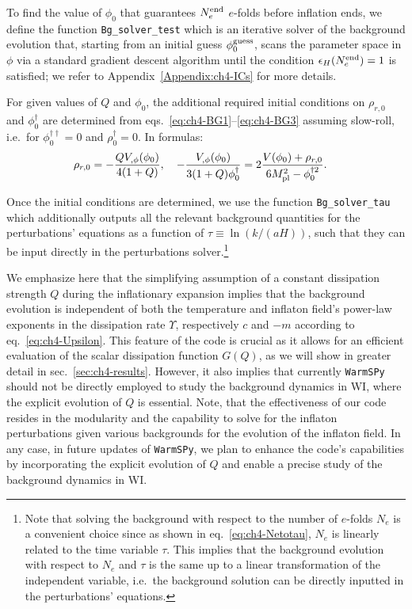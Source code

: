 To find the value of $\phi_0$ that guarantees $N_e^{\rm{end}}$ $e$-folds before inflation ends, we define the function \texttt{Bg\_solver\_test} which is an iterative solver of the background evolution that, starting from an initial guess $\phi_0^{\rm{guess}}$, scans the parameter space in $\phi$ via a standard gradient descent algorithm until the condition $\epsilon_H(N_e^{\rm{end}})=1$ is satisfied; we refer to Appendix~\ref{Appendix:ch4-ICs} for more details.
 
For given values of $Q$ and $\phi_0$, the additional required initial conditions on $\rho_{r,0}$ and $\phi^\dagger_0$ are determined from eqs.~\eqref{eq:ch4-BG1}--\eqref{eq:ch4-BG3} assuming slow-roll, i.e.\ for $\phi^{\dagger\dagger}_0=0$ and $\rho^{\dagger}_0=0$. In formulas:
\begin{align}
    & \rho_{r,0}=-\frac{Q V_{,\phi}(\phi_0)}{4(1+Q)}, \quad
-\frac{V_{,\phi}(\phi_0)}{3(1+Q)\phi_0^\dagger}=2\frac{V(\phi_0)+\rho_{r,0}}{6M_{\rm{pl}}^2-\phi^{\dagger 2}_0}.
\end{align}

Once the initial conditions are determined, we use the function \texttt{Bg\_solver\_tau} which additionally outputs all the relevant background quantities for the perturbations' equations as a function of $\tau \equiv \ln(k/(aH))$, such that they can be input directly in the perturbations solver.\footnote{
Note that solving the background with respect to the number of $e$-folds $N_e$ is a convenient choice since as shown in eq.~\eqref{eq:ch4-Netotau}, $N_e$ is linearly related to the time variable $\tau$. This implies that the background evolution with respect to $N_e$ and $\tau$ is the same up to a linear transformation of the independent variable, i.e.\ the background solution can be directly inputted in the perturbations' equations.
}

We emphasize here that the simplifying assumption of a constant dissipation strength $Q$ during the inflationary expansion implies that the background evolution is independent of both the temperature and inflaton field's power-law exponents in the dissipation rate $\Upsilon$, respectively $c$ and $-m$ according to eq.~\eqref{eq:ch4-Upsilon}. This feature of the code is crucial as it allows for an efficient evaluation of the scalar dissipation function $G(Q)$, as we will show in greater detail in sec.~\ref{sec:ch4-results}. However, it also implies that currently \texttt{WarmSPy} should not be directly employed to study the background dynamics in WI, where the explicit evolution of $Q$ is essential. Note, that the effectiveness of our code resides in the modularity and the capability to solve for the inflaton perturbations given various backgrounds for the evolution of the inflaton field. In any case, in future updates of \texttt{WarmSPy}, we plan to enhance the code's capabilities by incorporating the explicit evolution of $Q$ and enable a precise study of the background dynamics in WI.


